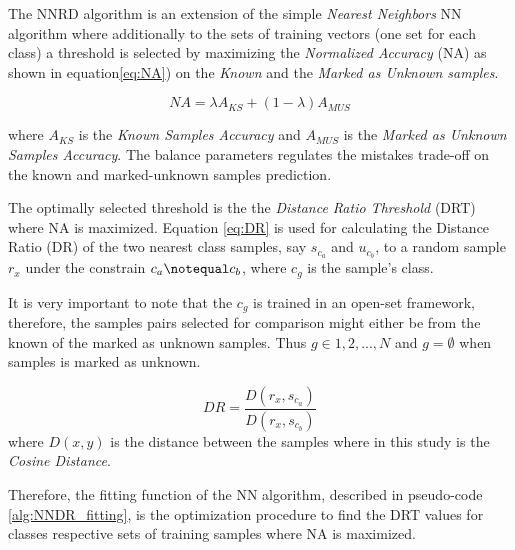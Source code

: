\documentclass[runningheads]{llncs}
\begin{document}
The NNRD algorithm is an extension of the simple \textit{Nearest Neighbors} NN algorithm where additionally to the sets of training vectors (one set for each class) a threshold is selected by maximizing the \textit{Normalized Accuracy} (NA) as shown in equation\ref{eq:NA}) on the \textit{Known} and the \textit{Marked as Unknown samples}.

\begin{equation} \label{eq:NA}
    NA = \lambda A_{KS} + (1 - \lambda) A_{MUS}
\end{equation}

\noindent
where $A_{KS}$ is the \textit{Known Samples Accuracy} and $A_{MUS}$ is the \textit{Marked as Unknown Samples Accuracy}. The balance parameters \lambda regulates the mistakes trade-off on the known and marked-unknown samples prediction.

The optimally selected threshold is the the \textit{Distance Ratio Threshold} (DRT) where NA is maximized. Equation \ref{eq:DR} is used for calculating the Distance Ratio (DR) of the two nearest class samples, say $s_{c_{a}}$ and $u_{c_{b}}$, to a random sample $r_{x}$ under the constrain $c_{a} \notequal c_{b}$, where $c_{g}$ is the sample's class.

It is very important to note that the $c_{g}$ is trained in an open-set framework, therefore, the samples pairs selected for comparison might either be from the known of the marked as unknown samples. Thus $g \in {1,2,...,N}$ and $g = \emptyset$ when samples is marked as unknown.

\begin{equation} \label{eq:DR}
    DR = \frac{D(r_{x}, s_{c_{a}})}{D(r_{x}, s_{c_{b}})}
\end{equation}
\noindent
where $D(x,y)$ is the distance between the samples where in this study is the \textit{Cosine Distance}.

Therefore, the fitting function of the NN algorithm, described in pseudo-code \ref{alg:NNDR_fitting}, is the optimization procedure to find the DRT values for classes respective sets of training samples where NA is maximized.

\hfill \break
\end{document}
